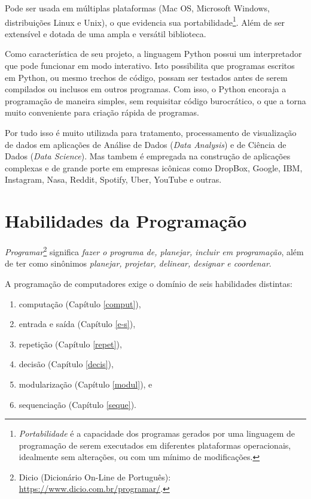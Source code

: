 \documentclass[
]{book}
\providecommand{\tightlist}{%
  \setlength{\itemsep}{0pt}\setlength{\parskip}{0pt}}
\begin{document}
Pode ser usada em múltiplas plataformas (Mac OS, Microsoft Windows, distribuições Linux e Unix), o que evidencia sua portabilidade\footnote{\emph{Portabilidade} é a capacidade dos programas gerados por uma linguagem de programação de serem executados em diferentes plataformas operacionais, idealmente sem alterações, ou com um mínimo de modificações.}. Além de ser extensível e dotada de uma ampla e versátil biblioteca.

Como característica de seu projeto, a linguagem Python possui um interpretador que pode funcionar em modo interativo. Isto possibilita que programas escritos em Python, ou mesmo trechos de código, possam ser testados antes de serem compilados ou inclusos em outros programas. Com isso, o Python encoraja a programação de maneira simples, sem requisitar código burocrático, o que a torna muito conveniente para criação rápida de programas.

Por tudo isso é muito utilizada para tratamento, processamento de visualização de dados em aplicações de Análise de Dados (\emph{Data Analysis}) e de Ciência de Dados (\emph{Data Science}). Mas tambem é empregada na construção de aplicações complexas e de grande porte em empresas icônicas como DropBox, Google, IBM, Instagram, Nasa, Reddit, Spotify, Uber, YouTube e outras.

\hypertarget{introd-habil}{%
\section{Habilidades da Programação}\label{introd-habil}}

\emph{Programar}\footnote{Dicio (Dicionário On-Line de Português): \url{https://www.dicio.com.br/programar/}.} significa \emph{fazer o programa de, planejar, incluir em programação}, além de ter como sinônimos \emph{planejar, projetar, delinear, designar e coordenar}.

A programação de computadores exige o domínio de seis habilidades distintas:

\begin{enumerate}
\def\labelenumi{\arabic{enumi}.}
\tightlist
\item
  computação (Capítulo \ref{comput}),
\item
  entrada e saída (Capítulo \ref{e-s}),
\item
  repetição (Capítulo \ref{repet}),
\item
  decisão (Capítulo \ref{decis}),
\item
  modularização (Capítulo \ref{modul}), e
\item
  sequenciação (Capítulo \ref{seque}).
\end{enumerate}
\end{document}
